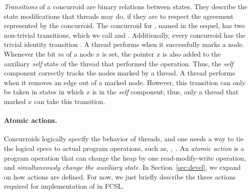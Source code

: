 \emph{Transitions} of a concurroid are binary relations between
states. They describe the state modifications that threads may do, if
they are to respect the agreement represented by the concurroid.
The concurroid for , named  in the sequel, 
has two non-trivial transitions, which
we call  and . Additionally,
every concurroid has the trivial identity transition .
%
A thread performs  when it successfully marks a
node. Whenever the bit $m$ of a node $x$ is set, the pointer $x$ is
also added to the auxiliary \emph{self} state of the thread that
performed the operation. Thus, the \emph{self} component correctly
tracks the nodes marked by a thread.
%
A thread performs  when it removes an edge out of
a marked node. However, this transition can only be taken in 
states in which $x$ is in the \emph{self} component; thus, only a
thread that marked $x$ can take this transition.




\paragraph{Atomic actions.~~}
\label{sec:trans-resp-acti}

Concurroids logically specify the behavior of threads, and one needs a
way to tie the logical specs to actual program operations, such as,
\eg,~.
% 
An \emph{atomic action} is a program operation that can change the
heap by one read-modify-write operation, and \emph{simultaneously
  change the auxiliary state}.  In Section~\ref{sec:devel}, we expand
on how actions are defined. %
For now, we just briefly describe the three actions required
for implementation of  in FCSL.

